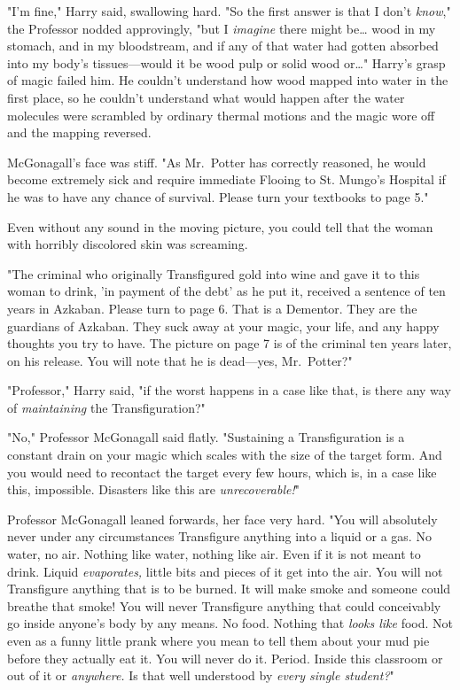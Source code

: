 "I'm fine," Harry said, swallowing hard. "So the first answer is that I don't 
\emph{know}," the Professor nodded approvingly, "but I \emph{imagine} there 
might be{\ldots} wood in my stomach, and in my bloodstream, and if any of that 
water had gotten absorbed into my body's tissues---would it be wood pulp or 
solid wood or{\ldots}" Harry's grasp of magic failed him. He couldn't 
understand how wood mapped into water in the first place, so he couldn't 
understand what would happen after the water molecules were scrambled by 
ordinary thermal motions and the magic wore off and the mapping reversed.

McGonagall's face was stiff. "As Mr.~Potter has correctly reasoned, he would 
become extremely sick and require immediate Flooing to St. Mungo's Hospital if 
he was to have any chance of survival. Please turn your textbooks to page 5."

Even without any sound in the moving picture, you could tell that the woman 
with horribly discolored skin was screaming.

"The criminal who originally Transfigured gold into wine and gave it to this 
woman to drink, 'in payment of the debt' as he put it, received a sentence of 
ten years in Azkaban. Please turn to page 6. That is a Dementor. They are the 
guardians of Azkaban. They suck away at your magic, your life, and any happy 
thoughts you try to have. The picture on page 7 is of the criminal ten years 
later, on his release. You will note that he is dead---yes, Mr.~Potter?"

"Professor," Harry said, "if the worst happens in a case like that, is there 
any way of \emph{maintaining} the Transfiguration?"

"No," Professor McGonagall said flatly. "Sustaining a Transfiguration is a 
constant drain on your magic which scales with the size of the target form. And 
you would need to recontact the target every few hours, which is, in a case 
like this, impossible. Disasters like this are \emph{unrecoverable!}"

Professor McGonagall leaned forwards, her face very hard. "You will absolutely 
never under any circumstances Transfigure anything into a liquid or a gas. No 
water, no air. Nothing like water, nothing like air. Even if it is not meant to 
drink. Liquid \emph{evaporates,} little bits and pieces of it get into the air. 
You will not Transfigure anything that is to be burned. It will make smoke and 
someone could breathe that smoke! You will never Transfigure anything that 
could conceivably go inside anyone's body by any means. No food. Nothing that 
\emph{looks like} food. Not even as a funny little prank where you mean to tell 
them about your mud pie before they actually eat it. You will never do it. 
Period. Inside this classroom or out of it or \emph{anywhere.} Is that well 
understood by \emph{every single student?}"

